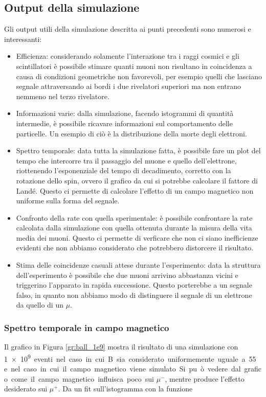 \subsection{Output della simulazione}
Gli output utili della simulazione descritta ai punti precedenti sono numerosi e interessanti:
\begin{itemize}
\item Efficienza: considerando solamente l'interazione tra i raggi cosmici e gli scintillatori è possibile stimare quanti muoni non risultano in coincidenza a causa
di condizioni geometriche non favorevoli, per esempio quelli che lasciano segnale attraversando ai bordi i due rivelatori superiori ma non entrano nemmeno nel terzo
rivelatore.
\item Informazioni varie: dalla simulazione, facendo istogrammi di quantit\`a intermedie, \`e possibile ricavare informazioni sul comportamento delle particelle. Un esempio di ci\`o \`e la distribuzione della morte degli elettroni.
\item Spettro temporale: data tutta la simulazione fatta, è possibile fare un plot del tempo che intercorre tra il passaggio del muone e quello dell'elettrone, riottenendo
l'esponenziale del tempo di decadimento, corretto con la rotazione dello spin, ovvero il grafico da cui si potrebbe calcolare il fattore di Land\'e. Questo ci permette di calcolare l'effetto di un campo magnetico non uniforme sulla forma del segnale.
\item Confronto della rate con quella sperimentale: \`e possibile confrontare la rate calcolata dalla simulazione con quella ottenuta durante la misura della vita media dei muoni. Questo ci permette di verficare che non ci siano inefficienze evidenti che non abbiamo considerato che potrebbero distorcere il risultato.
\item Stima delle coincidenze casuali attese durante l'esperimento: data la struttura dell'esperimento \`e possibile che due muoni arrivino abbastanza vicini e triggerino l'apparato in rapida successione. Questo porterebbe a un segnale falso, in quanto non abbiamo modo di distinguere il segnale di un elettrone da quello di un $\mu$.
\end{itemize}

\subsubsection{Spettro temporale in campo magnetico}
Il grafico in Figura \ref{gr:ball_1e9} mostra il risultato di una simulazione con \SI{1e9} eventi nel caso in cui B sia considerato uniformemente uguale a \SI{55}{\gauss} e nel caso in cui il campo magnetico viene simulato. 
Si pu\`o vedere dal grafico come il campo magnetico influisca poco sui $\mu^-$, mentre produce l'effetto desiderato sui $\mu^+$. 
Da un fit sull'istogramma con la funzione

